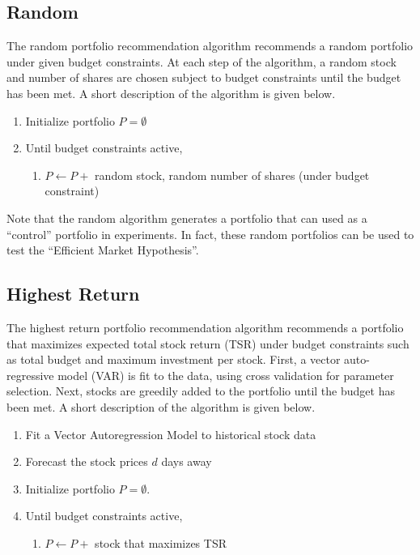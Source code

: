 \documentclass{article}
\begin{document}
\subsection{Random}
The random portfolio recommendation algorithm recommends a random portfolio under given budget constraints. At each step of the algorithm, a random stock and number of shares are chosen subject to budget constraints until the budget has been met. A short description of the algorithm is given below.

\begin{enumerate}
	\item Initialize portfolio $P = \emptyset$
	\item Until budget constraints active,
		\begin{enumerate}
			\item $P \leftarrow P +$ random stock, random number of shares (under budget constraint)
		\end{enumerate}
\end{enumerate}

Note that the random algorithm generates a portfolio that can used as a ``control'' portfolio in experiments. In fact, these random portfolios can be used to test the ``Efficient Market Hypothesis''.

\subsection{Highest Return}
The highest return portfolio recommendation algorithm recommends a portfolio that maximizes expected total stock return (TSR) under budget constraints such as total budget and maximum investment per stock. First, a vector auto-regressive model (VAR) is fit to the data, using cross validation for parameter selection. Next, stocks are greedily added to the portfolio until the budget has been met. A short description of the algorithm is given below.

\begin{enumerate}
	\item Fit a Vector Autoregression Model to historical stock data
	\item Forecast the stock prices $d$ days away
	\item Initialize portfolio $P = \emptyset$. 
	\item Until budget constraints active,
		\begin{enumerate}
			\item $P \leftarrow P +$ stock that maximizes TSR
		\end{enumerate}
\end{enumerate}
\end{document}
